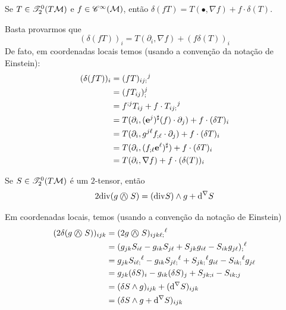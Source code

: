         \begin{lema}\label{div(fT)}
        Se $T \in \mathscr{T}^0_2(T \mathcal{M})$ e $f \in \mathscr{C}^{\infty}(\mathcal{M})$, então $\delta(fT) = T(\bullet, \nabla f) + f \cdot \delta(T)$. 
        \end{lema}
        
        \begin{demm}
       Basta provarmos que
        \[
        (\delta(fT))_i = T(\partial_i, \nabla f) + (f  \delta(T))_i
        \]
        De fato, em coordenadas locais temos (usando a convenção da notação de Einstein):
        \[ \begin{aligned}
        (\delta(fT))_i &= (fT)_{ij;}{}^j \\
        &=(fT_{ij})_{;}^j \\
        &= f^{;j} T_{ij} + f \cdot T_{ij;}{}^j \\
        &= T(\partial_i, (\mathbf{e}^j)^{\sharp}(f) \cdot  \partial_j) + f \cdot (\delta T)_i \\
        &= T(\partial_i, g^{j \ell} f_{;\ell} \cdot  \partial_{j}) + f \cdot (\delta T)_i \\
        &= T(\partial_i , (f_{;\ell} \mathbf{e}^{\ell})^{\sharp}) + f \cdot (\delta T)_i \\
        &=  T(\partial_i, \nabla f) + f \cdot (\delta(T))_i
        \end{aligned}
        \]
        \end{demm}
        \begin{lema}\label{divKN}
        Se $S \in \mathscr{T}^0_2(T \mathcal{M})$ é um $2$-tensor, então
        \[
        2 \mathrm{div}(g \mathbin{\bigcirc\mspace{-15mu}\wedge\mspace{4mu}} S) = (\mathrm{div} S) \wedge g + \mathrm{d}^{\nabla} S
        \] 
        \end{lema}
        
        \begin{demm}
        Em coordenadas locais, temos (usando a convenção da notação de Einstein)
        \[ \begin{aligned}
        (2 \delta(g \mathbin{\bigcirc\mspace{-15mu}\wedge\mspace{4mu}} S))_{ijk} &= (2 g \mathbin{\bigcirc\mspace{-15mu}\wedge\mspace{4mu}} S)_{ijk \ell ;}{}^{\ell} \\
        &= (g_{jk} S_{i \ell} - g_{ik} S_{j \ell} + S_{jk} g_{i \ell} - S_{ik}g_{j \ell})_{;}{}^{\ell} \\
        &= g_{jk} S_{i \ell ;}{}^{\ell} - g_{ik} S_{j \ell ;}{}^{\ell} + S_{j k ;}{}^{\ell} g_{i \ell} - S_{i k ;}{}^{\ell} g_{j \ell} \\
        &= g_{jk}(\delta S)_i - g_{ik} (\delta S)_j + S_{jk;i} - S_{ik;j} \\
        &= (\delta S \wedge g)_{ijk} + (\mathrm{d}^{\nabla} S)_{ijk} \\
        &= (\delta S \wedge g + \mathrm{d}^{\nabla} S)_{ijk}
        \end{aligned}
        \]
        
        \end{demm}
        
